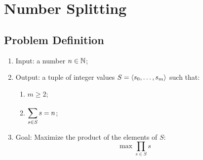 \chapter{Number Splitting}

\newcommand{\Product}[2]{\prod\limits_{#1} #2}

\section{Problem Definition}

\begin{enumerate}
    \item Input: a number $n \in \mathbb{N}$;
    \item Output: a tuple of integer values $S = \left\langle s_{0}, \dots, s_{m} \right\rangle$ such that:
    \begin{enumerate}
        \item $m \geqslant 2$;
        \item $\displaystyle\sum\limits_{s \in S}^{} s = n$;
    \end{enumerate}
    \item Goal: Maximize the product of the elements of $S$:
    \begin{equation}
        \max \Product{s \in S}{s}
    \end{equation}
\end{enumerate}
